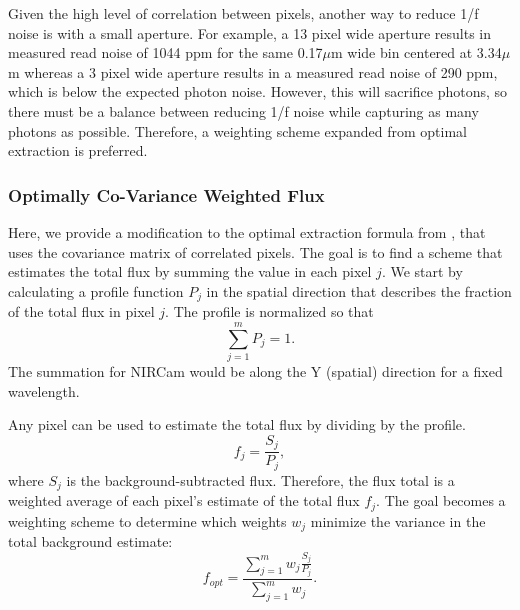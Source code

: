\documentclass[]{aastex62}
\begin{document}
Given the high level of correlation between pixels, another way to reduce 1/f noise is with a small aperture.
For example, a 13 pixel wide aperture results in measured read noise of 1044 ppm for the same 0.17$\mu$m wide bin centered at 3.34$\mu$m whereas a 3 pixel wide aperture results in a measured read noise of 290 ppm, which is below the expected photon noise.
However, this will sacrifice photons, so there must be a balance between reducing 1/f noise while capturing as many photons as possible.
Therefore, a weighting scheme expanded from optimal extraction \citep{horne1986optimalE} is preferred.

\subsubsection{Optimally Co-Variance Weighted Flux}\label{sec:optimalCovWeights}

Here, we provide a modification to the optimal extraction formula from \citet{horne1986optimalE}, that uses the covariance matrix of correlated pixels.
The goal is to find a scheme that estimates the total flux by summing the value in each pixel $j$.
We start by calculating a profile function $P_j$ in the spatial direction that describes the fraction of the total flux in pixel $j$.
The profile is normalized so that
\begin{equation*}
\sum_{j=1}^{m} P_j = 1.
\end{equation*}
The summation for NIRCam would be along the Y (spatial) direction for a fixed wavelength.

Any pixel can be used to estimate the total flux by dividing by the profile.
\begin{equation*}
f_j = \frac{S_j}{P_j},
\end{equation*}
where $S_j$ is the background-subtracted flux.
Therefore, the flux total is a weighted average of each pixel's estimate of the total flux $f_j$.
The goal becomes a weighting scheme to determine which weights $w_j$ minimize the variance in the total background estimate:
\begin{equation*}
f_{opt} = \frac{\sum_{j=1}^{m} w_j \frac{S_j}{P_j}}{\sum_{j=1}^{m} w_j}.
\end{equation*}
\end{document}
